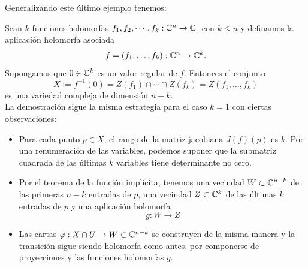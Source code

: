 Generalizando este último ejemplo tenemos:
\begin{example}\label{interseccioncompleja}
	Sean $k$ funciones holomorfas $f_1,f_2,\cdots,f_k:\mathbb{C}^n\to \mathbb{C}$, con $k\leq n$ y definamos la aplicación holomorfa asociada
	\begin{equation*}
		f=(f_1,\dots,f_k):\mathbb{C}^n\to\mathbb{C}^k.
	\end{equation*}   
	Supongamos que $0\in\mathbb{C}^k$ es un valor regular de $f$. Entonces el conjunto
	\begin{equation*}
		X:=f^{-1}(0)=Z(f_1)\cap\cdots\cap Z(f_k)=Z(f_1,\dots,f_k)
	\end{equation*}
	es una variedad compleja de dimensión $n-k$.\\
	La demostración sigue la misma estrategia para el caso $k=1$ con ciertas observaciones:
	\begin{itemize}
		\item Para cada punto $p\in X$, el rango de la matriz jacobiana $J(f)(p)$ es $k$. Por una renumeración de las variables, podemos suponer que la submatriz cuadrada de las últimas $k$ variables tiene determinante no cero.
		\item Por el teorema de la función implícita, tenemos una vecindad $W\subset\mathbb{C}^{n-k}$ de las primeras $n-k$ entradas de $p$, una vecindad $Z\subset\mathbb{C}^k$ de las últimas $k$ entradas de $p$ y una aplicación holomorfa
		\begin{equation*}
			g:W\to Z
		\end{equation*}
		\item Las cartas $\varphi:X\cap U\to W\subset\mathbb{C}^{n-k}$ se construyen de la misma manera y la transición sigue siendo holomorfa como antes, por componerse de proyecciones y las funciones holomorfas $g$.
	\end{itemize}
	
\end{example}

